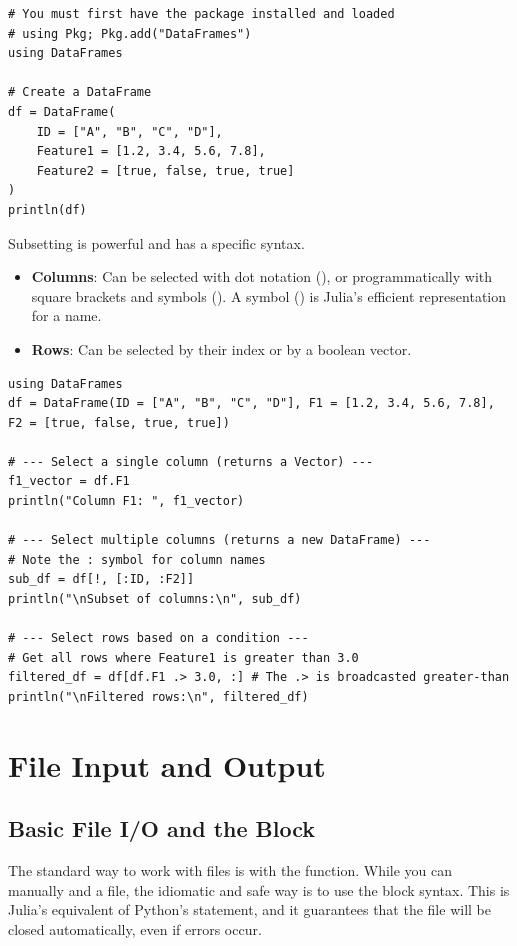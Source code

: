\begin{example}
\text{ }\begin{verbatim}
# You must first have the package installed and loaded
# using Pkg; Pkg.add("DataFrames")
using DataFrames

# Create a DataFrame
df = DataFrame(
    ID = ["A", "B", "C", "D"],
    Feature1 = [1.2, 3.4, 5.6, 7.8],
    Feature2 = [true, false, true, true]
)
println(df)
\end{verbatim}
\end{example}

Subsetting is powerful and has a specific syntax.
\begin{itemize}
    \item \textbf{Columns}: Can be selected with dot notation (), or programmatically with square brackets and symbols (). A symbol () is Julia's efficient representation for a name.
    \item \textbf{Rows}: Can be selected by their index or by a boolean vector.
\end{itemize}

\begin{example}
\text{ }\begin{verbatim}
using DataFrames
df = DataFrame(ID = ["A", "B", "C", "D"], F1 = [1.2, 3.4, 5.6, 7.8], F2 = [true, false, true, true])

# --- Select a single column (returns a Vector) ---
f1_vector = df.F1
println("Column F1: ", f1_vector)

# --- Select multiple columns (returns a new DataFrame) ---
# Note the : symbol for column names
sub_df = df[!, [:ID, :F2]]
println("\nSubset of columns:\n", sub_df)

# --- Select rows based on a condition ---
# Get all rows where Feature1 is greater than 3.0
filtered_df = df[df.F1 .> 3.0, :] # The .> is broadcasted greater-than
println("\nFiltered rows:\n", filtered_df)
\end{verbatim}
\end{example}

\section{File Input and Output}
\label{sec:julia_files}

\subsection*{Basic File I/O and the  Block}
The standard way to work with files is with the  function. While you can manually  and  a file, the idiomatic and safe way is to use the \textbf{} block syntax. This is Julia's equivalent of Python's  statement, and it guarantees that the file will be closed automatically, even if errors occur.

